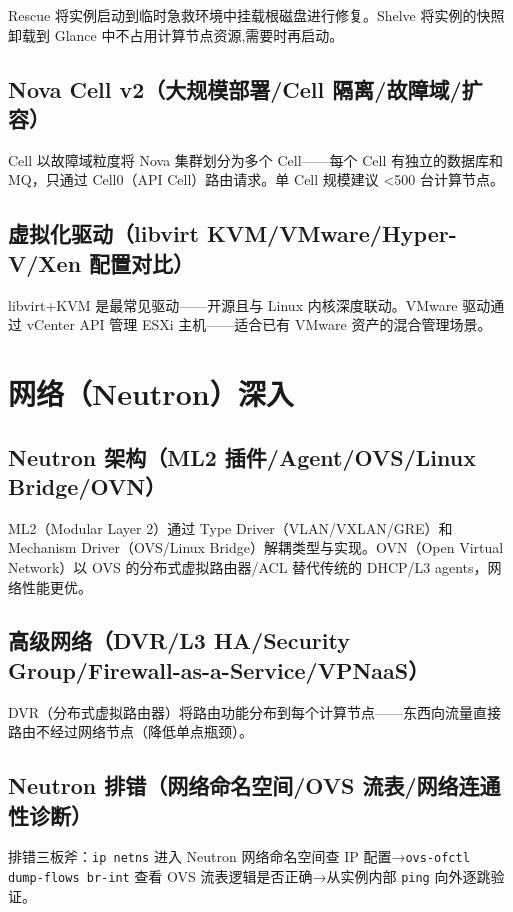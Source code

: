 \documentclass[12pt,UTF8]{ctexbook}
\begin{document}
Rescue 将实例启动到临时急救环境中挂载根磁盘进行修复。Shelve 将实例的快照卸载到 Glance 中不占用计算节点资源,需要时再启动。

    \subsection{Nova Cell v2（大规模部署/Cell 隔离/故障域/扩容）}

Cell 以故障域粒度将 Nova 集群划分为多个 Cell——每个 Cell 有独立的数据库和 MQ，只通过 Cell0（API Cell）路由请求。单 Cell 规模建议 <500 台计算节点。

    \subsection{虚拟化驱动（libvirt KVM/VMware/Hyper-V/Xen 配置对比）}

libvirt+KVM 是最常见驱动——开源且与 Linux 内核深度联动。VMware 驱动通过 vCenter API 管理 ESXi 主机——适合已有 VMware 资产的混合管理场景。

  \section{网络（Neutron）深入}
    \subsection{Neutron 架构（ML2 插件/Agent/OVS/Linux Bridge/OVN）}

ML2（Modular Layer 2）通过 Type Driver（VLAN/VXLAN/GRE）和 Mechanism Driver（OVS/Linux Bridge）解耦类型与实现。OVN（Open Virtual Network）以 OVS 的分布式虚拟路由器/ACL 替代传统的 DHCP/L3 agents，网络性能更优。

    \subsection{高级网络（DVR/L3 HA/Security Group/Firewall-as-a-Service/VPNaaS）}

DVR（分布式虚拟路由器）将路由功能分布到每个计算节点——东西向流量直接路由不经过网络节点（降低单点瓶颈）。

    \subsection{Neutron 排错（网络命名空间/OVS 流表/网络连通性诊断）}

排错三板斧：\texttt{ip netns} 进入 Neutron 网络命名空间查 IP 配置→\texttt{ovs-ofctl dump-flows br-int} 查看 OVS 流表逻辑是否正确→从实例内部 \texttt{ping} 向外逐跳验证。
\end{document}
